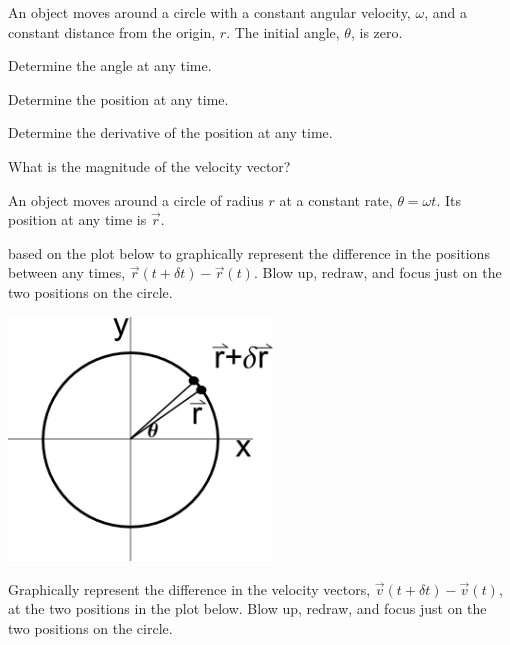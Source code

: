 \begin{problem}
\item An object moves around a circle with a constant angular
  velocity, $\omega$, and a constant distance from the origin,
  $r$. The initial angle, $\theta$, is zero.
  \begin{subproblem}
  \item Determine the angle at any time.
    \vfill
  \item Determine the position at any time.
    \vfill
  \item Determine the derivative of the position at any time.
    \vfill
  \item What is the magnitude of the velocity vector?
    \vfill
  \end{subproblem}

  \clearpage

\item An object moves around a circle of radius $r$  at a constant
  rate, $\theta=\omega t$. Its position at any time is $\vec{r}$.

  \begin{subproblem}
  \item based on the plot below to graphically represent the
    difference in the positions between any times, $\vec{r}(t+\delta
    t)-\vec{r}(t)$. Blow up, redraw, and focus just on the two
    positions on the circle.

    \includegraphics[width=7cm]{ink/week12/circularAcceleration}

    \vfill

  \item Graphically represent the difference in the velocity vectors,
    $\vec{v}(t+\delta t)-\vec{v}(t)$, at the two positions in the plot
    below. Blow up, redraw, and focus just on the two positions on the
    circle.


\end{subproblem}
\end{problem}
